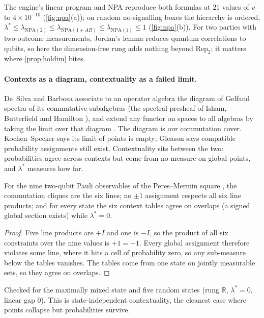 \documentclass[11pt]{article}
\theoremstyle{definition}\newtheorem{definition}[theorem]{Definition}\newtheorem{remark}[theorem]{Remark}\newtheorem{example}[theorem]{Example}
\newcommand{\R}{\mathbb R}
\begin{document}
The engine's linear program and NPA reproduce both formulas at $21$ values of $v$ to $4\times10^{-10}$ (\cref{fig:npa}(a)); on random
no-signalling boxes the hierarchy is ordered, $\lambda^*\le\lambda_{\mathrm{NPA}(2)}\le\lambda_{\mathrm{NPA}(1+AB)}\le\lambda_{\mathrm{NPA}(1)}\le1$
(\cref{fig:npa}(b)). For two parties with two-outcome measurements, Jordan's lemma reduces quantum correlations to qubits, so here the
dimension-free rung adds nothing beyond $\mathrm{Rep}_2$; it matters where \cref{prop:holdim} bites.

\paragraph{Contexts as a diagram, contextuality as a failed limit.}
De~Silva and Barbosa associate to an operator algebra the diagram of Gelfand spectra of its commutative subalgebras (the spectral presheaf of
Isham, Butterfield and Hamilton \cite{IshamButterfield1998}), and extend any functor on spaces to all algebras by taking the limit over that
diagram \cite{deSilvaBarbosa2019}. The diagram is our commutation cover. Kochen--Specker \cite{KochenSpecker1967} says its limit of points is
empty; Gleason \cite{Gleason1957} says compatible probability assignments still exist. Contextuality sits between the two: probabilities agree
across contexts but come from no measure on global points, and $\lambda^*$ measures how far.

\begin{proposition}\label{prop:pm}
For the nine two-qubit Pauli observables of the Peres--Mermin square \cite{Peres1990,Mermin1990}, the commutation cliques are the six lines; no
$\pm1$ assignment respects all six line products; and for every state the six context tables agree on overlaps (a signed global section exists)
while $\lambda^*=0$.
\end{proposition}

\begin{proof}
Five line products are $+I$ and one is $-I$, so the product of all six constraints over the nine values is $+1=-1$. Every global assignment
therefore violates some line, where it hits a cell of probability zero, so any sub-measure below the tables vanishes. The tables come from one
state on jointly measurable sets, so they agree on overlaps.
\end{proof}

Checked for the maximally mixed state and five random states (rung $\R$, $\lambda^*=0$, linear gap $0$). This is state-independent
contextuality, the cleanest case where points collapse but probabilities survive.
\end{document}
